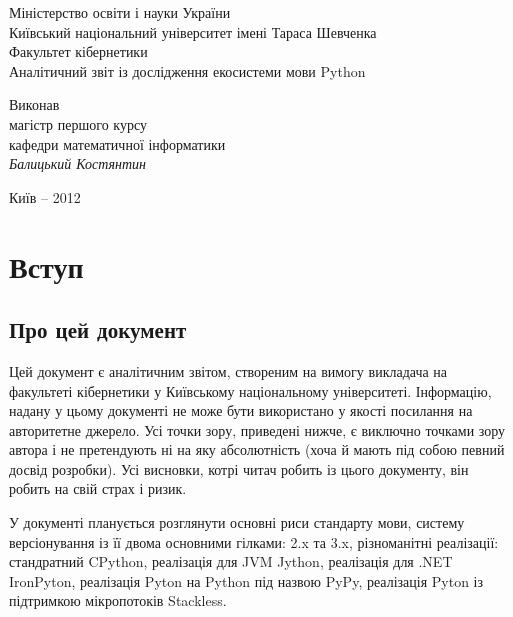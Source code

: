 \documentclass[a4paper, 12pt, onsedie]{article}
\begin{document}
\begin{titlepage}
    \begin{center}
        \normalsize{
            Міністерство освіти і науки України\\
            Київський національний університет імені Тараса Шевченка\\
            Факультет кібернетики\\[4.0cm]
        }
        \Huge{Аналітичний звіт із дослідження екосистеми мови Python}\\[9.0cm]
        \large{
            \begin{flushright}
                \parbox[position=right]{230px}{
                    Виконав\\
                    магістр першого курсу\\
                    кафедри математичної інформатики\\
                    \textit{Балицький Костянтин}
                }
            \end{flushright}
        }

        \vfill{\normalsize{Київ -- 2012}}
    \end{center}
\end{titlepage}

\tableofcontents
\pagebreak

\section{Вступ}

\subsection{Про цей документ}

    Цей документ є аналітичним звітом, створеним на вимогу викладача на факультеті кібернетики у Київському
    національному університеті. Інформацію, надану у цьому документі не може бути використано у якості посилання на
    авторитетне джерело. Усі точки зору, приведені нижче, є виключно точками зору автора і не претендують ні на яку
    абсолютність (хоча й мають під собою певний досвід розробки). Усі висновки, котрі читач робить із цього
    документу, він робить на свій страх і ризик.

    У документі планується розглянути основні риси стандарту мови, систему версіонування із її двома основними
    гілками: 2.x та 3.x, різноманітні реалізації: стандратний CPython, реалізація для JVM Jython, реалізація для 
    .NET IronPyton, реалізація Pyton на Python під назвою PyPy, реалізація Pyton із підтримкою мікропотоків Stackless. 
\end{document}
